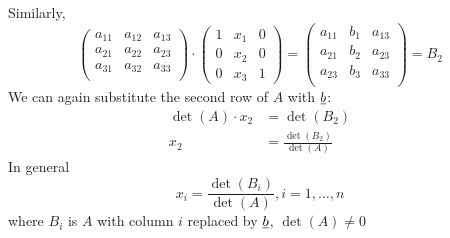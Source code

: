 Similarly,
\[
\begin{pmatrix}
a_{11} & a_{12} & a_{13}\\
a_{21} & a_{22} & a_{23}\\
a_{31} & a_{32} & a_{33}\\
\end{pmatrix}\cdot \begin{pmatrix}
1 & x_1 & 0\\
0 & x_2 & 0\\
0 & x_3 & 1
\end{pmatrix} = \begin{pmatrix}
a_{11} & b_{1} & a_{13}\\
a_{21} & b_{2} & a_{23}\\
a_{23} & b_{3} & a_{33}\\
\end{pmatrix} = B_2
\]
We can again substitute the second row of $A$ with $\underline{b}$:
\begin{align*}
\det(A)\cdot x_2 &= \det(B_2)\\
x_2 &=\frac{\det(B_2)}{\det(A)}
\end{align*}
In general
\[
x_i = \frac{\det(B_i)}{\det(A)}, i=1,\dots,n
\]
where $B_i$ is $A$ with column $i$ replaced by $\underline{b}$, $\det(A)\not=0$

